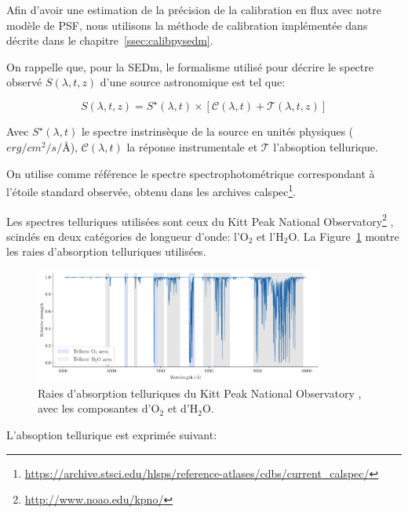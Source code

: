 \documentclass[../main/main.tex]{subfiles}
\begin{document}
Afin d'avoir une estimation de la précision de la calibration en flux
avec notre modèle de PSF, nous utilisons la
méthode de calibration implémentée dans  \citep{pysedm} décrite dans le
chapitre~\ref{ssec:calibpysedm}.

On rappelle que, pour la SEDm, le formalisme utilisé pour décrire le
spectre observé $S(\lambda,t,z)$ d'une source astronomique est tel que:

\begin{equation*} 
  S(\lambda,t,z)=S^{\star}(\lambda,t)\times\left[\mathcal{C}(\lambda,t)+\mathcal{ T}(\lambda,t,z)\right]
\end{equation*}

Avec $S^{\star}(\lambda,t)$ le spectre instrinsèque de la source en
unités physiques ($erg/cm^2/s/$\AA), $\mathcal{C}(\lambda,t)$ la réponse
instrumentale et $\mathcal{T}$ l'absoption tellurique.

On utilise comme référence le spectre spectrophotométrique
correspondant à l'étoile standard observée, obtenu dans les archives
calspec\footnote{\url{https://archive.stsci.edu/hlsps/reference-atlases/cdbs/current_calspec/}}.

Les spectres
telluriques utilisées sont ceux du Kitt Peak National
Observatory\footnote{\url{http://www.noao.edu/kpno/}} \citep{Hinkle2003}, scindés en deux
catégories de longueur d'onde: l'$\text{O}_{2}$ et
l'$\text{H}_{2}\text{O}$. La Figure~\ref{fig:telluriclines} montre les raies d'absorption telluriques utilisées.

\begin{figure}[ht]
  \centering
  \includegraphics[width=0.85\textwidth]{../figures/06_irf/telluricspec.pdf}
  \caption[Raies d'absorption telluriques]{Raies d'absorption
    telluriques du Kitt Peak National Observatory \citep{Hinkle2003}, avec les composantes d'$\text{O}_{2}$ et
    d'$\text{H}_{2}\text{O}$.}
  \label{fig:telluriclines}
\end{figure}

L'absoption tellurique est exprimée suivant:
\end{document}
